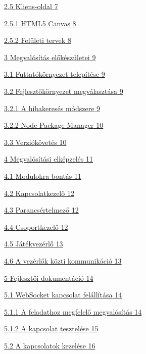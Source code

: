 \documentclass[]{article}
\begin{document}
\protect\hyperlink{kliens-oldal}{{2.5} {Kliens-oldal} 7}

\protect\hyperlink{html5-canvas}{{2.5.1} {HTML5 Canvas} 8}

\protect\hyperlink{feluxfcleti-tervek}{{2.5.2} {Felületi tervek} 8}

\protect\hyperlink{megvaluxf3suxedtuxe1s-elux151kuxe9szuxfcletei}{{3}
{Megvalósítás előkészületei} 9}

\protect\hyperlink{futtatuxf3kuxf6rnyezet-telepuxedtuxe9se}{{3.1}
{Futtatókörnyezet telepítése} 9}

\protect\hyperlink{fejlesztux151kuxf6rnyezet-megvuxe1lasztuxe1sa}{{3.2}
{Fejlesztőkörnyezet megválasztása} 9}

\protect\hyperlink{a-hibakeresuxe9s-muxf3dszere}{{3.2.1} {A hibakeresés
módszere} 9}

\protect\hyperlink{node-package-manager}{{3.2.2} {Node Package Manager}
10}

\protect\hyperlink{verziuxf3kuxf6vetuxe9s}{{3.3} {Verziókövetés} 10}

\protect\hyperlink{megvaluxf3suxedtuxe1si-elkuxe9pzeluxe9s}{{4}
{Megvalósítási elképzelés} 11}

\protect\hyperlink{modulokra-bontuxe1s}{{4.1} {Modulokra bontás} 11}

\protect\hyperlink{kapcsolatkezelux151}{{4.2} {Kapcsolatkezelő} 12}

\protect\hyperlink{parancsuxe9rtelmezux151}{{4.3} {Parancsértelmező} 12}

\protect\hyperlink{csoportkezelux151}{{4.4} {Csoportkezelő} 12}

\protect\hyperlink{juxe1tuxe9kvezuxe9rlux151}{{4.5} {Játékvezérlő} 13}

\protect\hyperlink{a-vezuxe9rlux151k-kuxf6zti-kommunikuxe1ciuxf3}{{4.6}
{A vezérlők közti kommunikáció} 13}

\protect\hyperlink{fejlesztux151i-dokumentuxe1ciuxf3}{{5} {Fejlesztői
dokumentáció} 14}

\protect\hyperlink{websocket-kapcsolat-feluxe1lluxedtuxe1sa}{{5.1}
{WebSocket kapcsolat felállítása} 14}

\protect\hyperlink{a-feladathoz-megfelelux151-megvaluxf3suxedtuxe1s}{{5.1.1}
{A feladathoz megfelelő megvalósítás} 14}

\protect\hyperlink{a-kapcsolat-teszteluxe9se}{{5.1.2} {A kapcsolat
tesztelése} 15}

\protect\hyperlink{a-kapcsolatok-kezeluxe9se}{{5.2} {A kapcsolatok
kezelése} 16}
\end{document}
